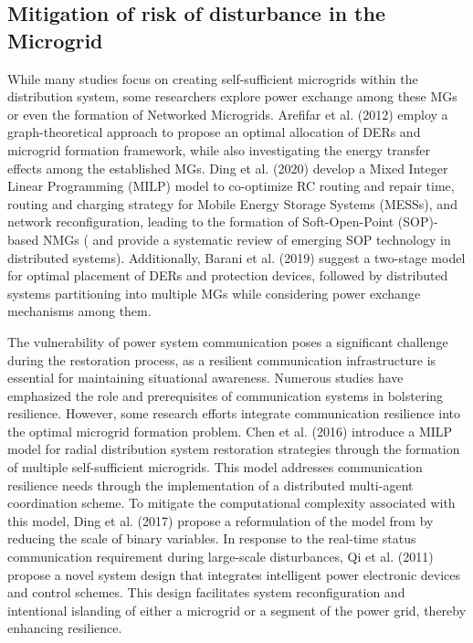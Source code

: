 \documentclass[conference]{IEEEtran}
\begin{document}
\subsection{Mitigation of risk of disturbance in the Microgrid}
While many studies focus on creating self-sufficient microgrids within the distribution system, some researchers explore power exchange among these MGs or even the formation of Networked Microgrids. Arefifar et al. (2012) \cite{b11} employ a graph-theoretical approach to propose an optimal allocation of DERs and microgrid formation framework, while also investigating the energy transfer effects among the established MGs. Ding et al. (2020) \cite{b12} develop a Mixed Integer Linear Programming (MILP) model to co-optimize RC routing and repair time, routing and charging strategy for Mobile Energy Storage Systems (MESSs), and network reconfiguration, leading to the formation of Soft-Open-Point (SOP)-based NMGs (\cite{b13} and \cite{b14} provide a systematic review of emerging SOP technology in distributed systems). Additionally, Barani et al. (2019) \cite{b15} suggest a two-stage model for optimal placement of DERs and protection devices, followed by distributed systems partitioning into multiple MGs while considering power exchange mechanisms among them.

The vulnerability of power system communication poses a significant challenge during the restoration process, as a resilient communication infrastructure is essential for maintaining situational awareness. Numerous studies have emphasized the role and prerequisites of communication systems in bolstering resilience. However, some research efforts integrate communication resilience into the optimal microgrid formation problem. Chen et al. (2016) \cite{b16} introduce a MILP model for radial distribution system restoration strategies through the formation of multiple self-sufficient microgrids. This model addresses communication resilience needs through the implementation of a distributed multi-agent coordination scheme. To mitigate the computational complexity associated with this model, Ding et al. (2017) \cite{b17} propose a reformulation of the model from \cite{b16} by reducing the scale of binary variables. In response to the real-time status communication requirement during large-scale disturbances, Qi et al. (2011) \cite{b18} propose a novel system design that integrates intelligent power electronic devices and control schemes. This design facilitates system reconfiguration and intentional islanding of either a microgrid or a segment of the power grid, thereby enhancing resilience.
\end{document}
